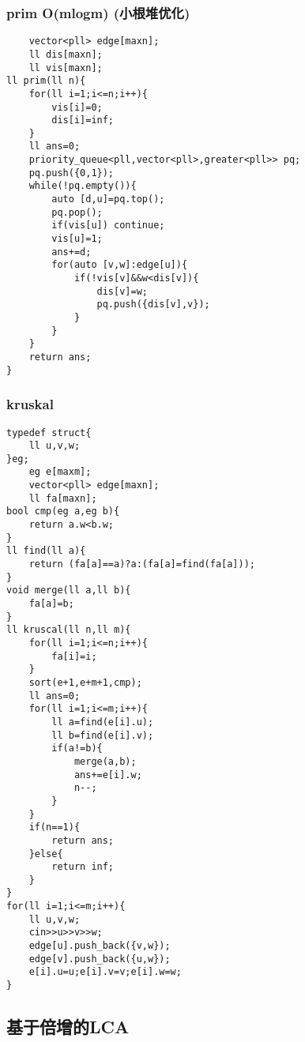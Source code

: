 \documentclass[]{article}
\begin{document}
\hypertarget{prim-omlogm-ux5c0fux6839ux5806ux4f18ux5316}{%
\subsubsection{prim O(mlogm)
(小根堆优化)}\label{prim-omlogm-ux5c0fux6839ux5806ux4f18ux5316}}

\begin{verbatim}
    vector<pll> edge[maxn];
    ll dis[maxn];
    ll vis[maxn];
ll prim(ll n){
    for(ll i=1;i<=n;i++){
        vis[i]=0;
        dis[i]=inf;
    }
    ll ans=0;
    priority_queue<pll,vector<pll>,greater<pll>> pq;
    pq.push({0,1});
    while(!pq.empty()){
        auto [d,u]=pq.top();
        pq.pop();
        if(vis[u]) continue;
        vis[u]=1;
        ans+=d;
        for(auto [v,w]:edge[u]){
            if(!vis[v]&&w<dis[v]){
                dis[v]=w;
                pq.push({dis[v],v});
            }
        }
    }
    return ans;
}
\end{verbatim}

\hypertarget{kruskal}{%
\subsubsection{kruskal}\label{kruskal}}

\begin{verbatim}
typedef struct{
    ll u,v,w;
}eg;
    eg e[maxm];
    vector<pll> edge[maxn];
    ll fa[maxn];
bool cmp(eg a,eg b){
    return a.w<b.w;
}
ll find(ll a){
    return (fa[a]==a)?a:(fa[a]=find(fa[a]));
}
void merge(ll a,ll b){
    fa[a]=b;
}
ll kruscal(ll n,ll m){
    for(ll i=1;i<=n;i++){
        fa[i]=i;
    }
    sort(e+1,e+m+1,cmp);
    ll ans=0;
    for(ll i=1;i<=m;i++){
        ll a=find(e[i].u);
        ll b=find(e[i].v);
        if(a!=b){
            merge(a,b);
            ans+=e[i].w;
            n--;
        }
    }
    if(n==1){
        return ans;
    }else{
        return inf;
    }
}
for(ll i=1;i<=m;i++){
    ll u,v,w;
    cin>>u>>v>>w;
    edge[u].push_back({v,w});
    edge[v].push_back({u,w});
    e[i].u=u;e[i].v=v;e[i].w=w;
}
\end{verbatim}

\hypertarget{ux57faux4e8eux500dux589eux7684lca}{%
\subsection{基于倍增的LCA}\label{ux57faux4e8eux500dux589eux7684lca}}
\end{document}

